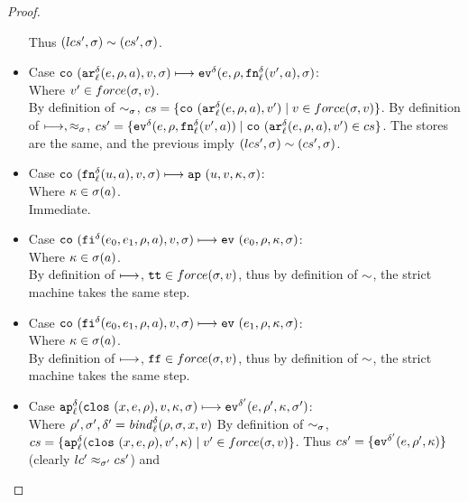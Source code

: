 \documentclass[preprint,onecolumn,9pt]{sigplanconf} %
\begin{document}
\begin{proof}
\begin{itemize}
{      Thus $\capprx{(lcs',\msto)}{(cs',\msto)}$.}
\item{Case $\co{\kar[^\mcntr_\mlab]{\mexp, \menv, \maddr}, \mval, \msto} \machstep
            \ev[^\mcntr]{\mexp, \menv, \kfn[^\mcntr_\mlab]{\mval',\maddr}, \msto}$: \\
      Where $v' \in force(\msto, \mval)$. \\
      By definition of $\apprx{}{\msto}{}$,
        $cs = \{\co{\kar[^\mcntr_\mlab]{\mexp, \menv, \maddr}, \mval'} \mid \mval \in force(\msto, \mval)\}$.
      By definition of $\machstep, \lapprx{}{\msto}{}$,
        $cs' = \{\ev[^\mcntr]{\mexp, \menv, \kfn[^\mcntr_\mlab]{\mval',\maddr}}
            \mid \co{\kar[^\mcntr_\mlab]{\mexp, \menv, \maddr}, \mval'} \in cs\}$.
      The stores are the same, and the previous imply $\capprx{(lcs',\msto)}{(cs',\msto)}$.}
\item{Case $\co{\kfn[^\mcntr_\mlab]{\mvalx{u}, \maddr}, \mval, \msto} \machstep
            \ap{\mvalx{u}, \mval, \mkont, \msto}$: \\
      Where $\mkont \in \msto(\maddr)$. \\
      Immediate.}
\item{Case $\co{\kif[^\mcntr]{\mexp_0, \mexp_1, \menv, \maddr}, \mval, \msto} \machstep
            \ev{\mexp_0, \menv, \mkont, \msto}$: \\
      Where $\mkont \in \msto(\maddr)$. \\
      By definition of $\machstep$, $\strue \in force(\msto, \mval)$, thus by definition of
      $\capprx{}{}$, the strict machine takes the same step.}
\item{Case $\co{\kif[^\mcntr]{\mexp_0, \mexp_1, \menv, \maddr}, \mval, \msto} \machstep
            \ev{\mexp_1, \menv, \mkont, \msto}$: \\
      Where $\mkont \in \msto(\maddr)$. \\
      By definition of $\machstep$, $\sfalse \in force(\msto, \mval)$, thus by definition of
      $\capprx{}{}$, the strict machine takes the same step.}
\item{Case $\ap[^\mcntr_\mlab]{\clos{\mvar, \mexp, \menv}, \mval, \mkont,\msto} \machstep
            \ev[^{\mcntr'}]{\mexp, \menv', \mkont, \msto'}$: \\
      Where $\menv', \msto', \mcntr' = \mathit{bind}^\mcntr_\mlab(\menv, \msto, \mvar, \mval)$
      By definition of $\apprx{}{\msto}{}$,
        $cs = \{\ap[^\mcntr_\mlab]{\clos{\mvar, \mexp, \menv}, \mval', \mkont} \mid
                \mval' \in force(\msto, \mval)\}$.
      Thus $cs' = \{\ev[^{\mcntr'}]{\mexp, \menv', \mkont}\}$ (clearly $\lapprx{lc'}{\msto'}{cs'}$)  and
}
\end{itemize}
\end{proof}
\end{document}

